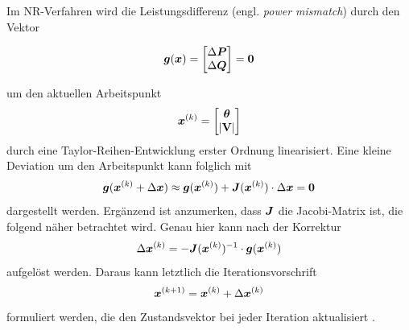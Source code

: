Im NR-Verfahren wird die Leistungsdifferenz (engl. \emph{power mismatch}) durch den Vektor 

\begin{equation}
	\boldsymbol{g}(\boldsymbol{x}) = 
	\begin{bmatrix}
		\Delta \boldsymbol{P} \\
		\Delta \boldsymbol{Q}
	\end{bmatrix}
	= \boldsymbol{0}
	\label{eq:mismatch_polar}
\end{equation}

um den aktuellen Arbeitspunkt
 \begin{equation}
   \boldsymbol{x}^{(k)}= \begin{bmatrix}
   	\boldsymbol{\theta} \\
   	 |\mathbf{V}|
   \end{bmatrix}
 	\label{eq:arbeitspunkt}
 \end{equation}
durch eine Taylor-Reihen-Entwicklung erster Ordnung linearisiert.
Eine kleine Deviation um den Arbeitspunkt kann folglich mit
\begin{equation}
	\boldsymbol{g}(\boldsymbol{x}^{(k)} + \Delta \boldsymbol{x}) \approx \boldsymbol{g}(\boldsymbol{x}^{(k)}) + \boldsymbol{J}(\boldsymbol{x}^{(k)}) \cdot \Delta \boldsymbol{x} = \boldsymbol{0}
	\label{eq:nr_taylor}
\end{equation}
dargestellt werden. 
Ergänzend ist anzumerken, dass  $\boldsymbol{J}$ die Jacobi-Matrix ist, die folgend näher betrachtet wird.
Genau hier kann nach der Korrektur
\begin{equation}
	\Delta \boldsymbol{x}^{(k)} = -\boldsymbol{J}(\boldsymbol{x}^{(k)})^{-1} \cdot \boldsymbol{g}(\boldsymbol{x}^{(k)})
	\label{eq:newton_richtung}
\end{equation}
aufgelöst werden.
Daraus kann letztlich die Iterationsvorschrift 
\begin{equation}
	\boldsymbol{x}^{(k+1)} = \boldsymbol{x}^{(k)} + \Delta \boldsymbol{x}^{(k)}
	\label{eq:nr_update}
\end{equation}
formuliert werden, die den Zustandsvektor bei jeder Iteration aktualisiert .\\ 

%
%

